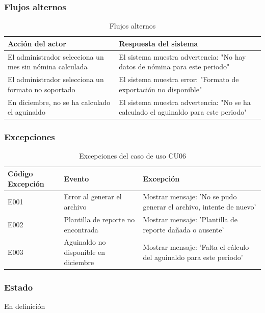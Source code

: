 \subsubsection*{Flujos alternos}
\begin{table}[h]
	\centering
	\caption{Flujos alternos}
	\begin{tabular}{|p{7cm}|p{7cm}|}
		\hline
		\textbf{Acción del actor}                               & \textbf{Respuesta del sistema}                                             \\ \hline
		El administrador selecciona un mes sin nómina calculada & El sistema muestra advertencia: "No hay datos de nómina para este periodo" \\ \hline
		El administrador selecciona un formato no soportado     & El sistema muestra error: "Formato de exportación no disponible"           \\ \hline
		En diciembre, no se ha calculado el aguinaldo           & El sistema muestra advertencia: "No se ha calculado el aguinaldo para este periodo" \\ \hline
	\end{tabular}
\end{table}

\newpage

\subsubsection*{Excepciones}
\begin{table}[h]
	\centering
	\caption{Excepciones del caso de uso CU06}
	\begin{tabular}{|p{3cm}|p{5cm}|p{5cm}|}
		\hline
		\textbf{Código Excepción} & \textbf{Evento}                    & \textbf{Excepción}                                                 \\ \hline
		E001                      & Error al generar el archivo        & Mostrar mensaje: 'No se pudo generar el archivo, intente de nuevo' \\ \hline
		E002                      & Plantilla de reporte no encontrada & Mostrar mensaje: 'Plantilla de reporte dañada o ausente'           \\ \hline
		E003                      & Aguinaldo no disponible en diciembre & Mostrar mensaje: 'Falta el cálculo del aguinaldo para este periodo' \\ \hline
	\end{tabular}
\end{table}

\subsubsection*{Estado}
En definición

